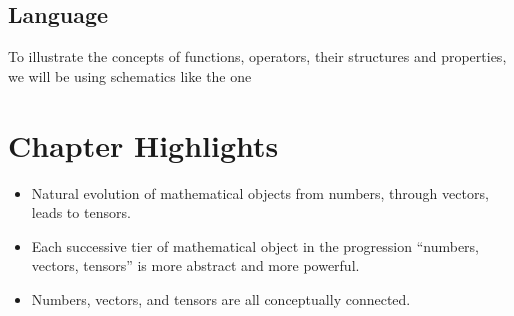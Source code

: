 \subsection{Language}
To illustrate the concepts of functions, operators, their structures and
properties, we will be using schematics like the one

\vspace{1cm}
\section*{Chapter Highlights}
{\chhc
  \it
\begin{itemize}
\item Natural evolution of mathematical objects from numbers, through
  vectors, leads to tensors.
\item Each successive tier of mathematical object in the progression
  ``numbers, vectors, tensors''  is more abstract and more powerful.
\item Numbers, vectors, and tensors are all conceptually connected.
\end{itemize}
}
